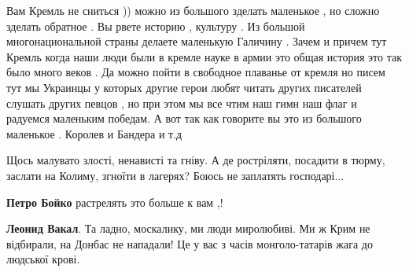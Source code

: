 \begin{itemize}
 

Вам Кремль не сниться )) можно из большого зделать маленькое , но сложно
зделать обратное . Вы рвете историю , культуру . Из большой многонациональной
страны делаете маленькую Галичину . Зачем и причем тут Кремль когда наши люди
были в кремле науке в армии это общая история это так было много веков . Да
можно пойти в свободное плаванье от кремля но писем тут мы Украинцы у которых
другие герои любят читать других писателей слушать других певцов , но при этом
мы все чтим наш гимн наш флаг и радуемся маленьким победам. А вот так как
говорите вы это из большого маленькое . Королев и Бандера и т.д


 

Щось малувато злості, ненависті та гніву. А де ростріляти, посадити в тюрму,
заслати на Колиму, згноїти в лагерях? Боюсь не заплатять господарі...

\begin{itemize}
 
\textbf{Петро Бойко} растрелять это больше к вам ,!

 
\textbf{Леонид Вакал}. Та ладно, москалику, ми люди миролюбиві. Ми ж Крим не відбирали, на Донбас не нападали! Це у вас з часів монголо-татарів жага до людської крові.
\end{itemize}

 

\end{itemize}
